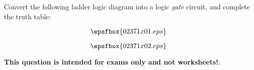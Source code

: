 

Convert the following ladder logic diagram into a logic {\it gate} circuit, and complete the truth table:

$$\epsfbox{02371x01.eps}$$







$$\epsfbox{02371x02.eps}$$







{\bf This question is intended for exams only and not worksheets!}.




